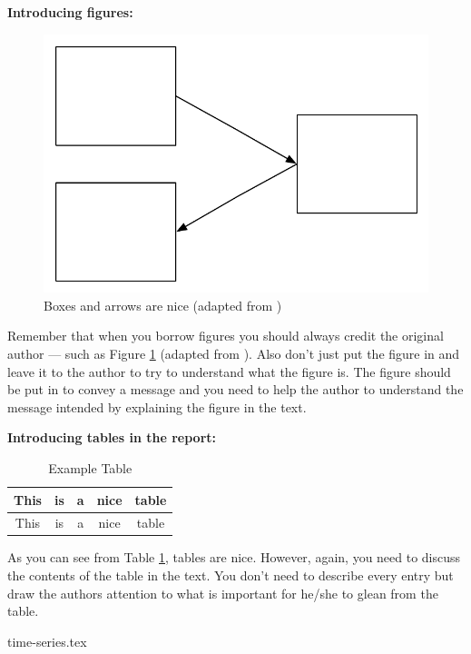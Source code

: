\vspace{0.5cm}

\noindent
{\bf Introducing figures:} \\

\begin{figure}[ht]
    \begin{center}
        \includegraphics[width=0.5\columnwidth]{figs/figure1.pdf}
        \caption[Boxes and arrows are nice]{Boxes and arrows are nice (adapted from \citet{Bandara2019})}
        \label{fig:BoxesAndArrowsAreNice}
    \end{center}
\end{figure}

Remember that when you borrow figures you should always credit the original author --- such as Figure \ref{fig:BoxesAndArrowsAreNice} (adapted from \citet{Bandara2019}). Also don't just put the figure in and leave it to the author to try to understand what the figure is. The figure should be put in to convey a message and you need to help the author to understand the message intended by explaining the figure in the text.

\vspace{0.5cm}

\noindent
{\bf Introducing tables in the report: }\\

\begin{table}[htbp]
    \begin{center}
        \begin{tabular}{|c|c|c|c|c|}\hline\hline
            This & is & a & nice & table \\\hline
            This & is & a & nice & table \\\hline\hline
        \end{tabular}
        \caption{Example Table}
    \end{center}
    \label{tab:ExampleTable}
\end{table}%

As you can see from Table \ref{tab:ExampleTable}, tables are nice. However, again, you need to discuss the contents of the table in the text. You don't need to describe every entry but draw the authors attention to what is important for he/she to glean from the table.

{time-series.tex}
